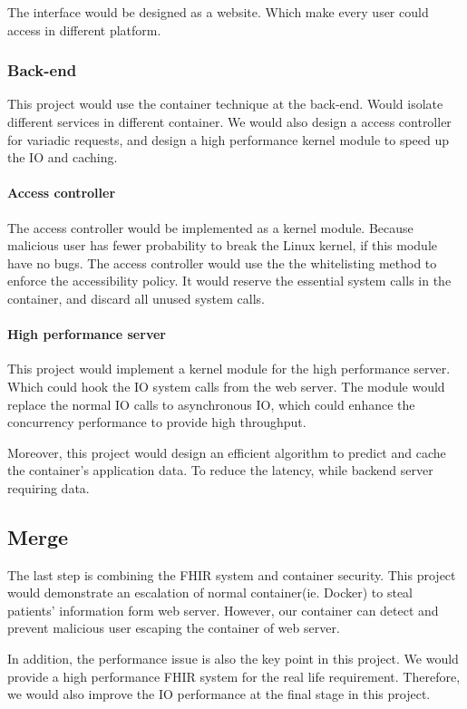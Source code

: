 \documentclass[12pt,a4paper]{IEEEconf}
\begin{document}
The interface would be designed as a website. Which make every user could access in different platform.

\subsubsection{Back-end}
This project would use the container technique at the back-end. Would isolate different services in
different container. We would also design a access controller for variadic requests, and
design a high performance kernel module to speed up the IO and caching.

\paragraph{Access controller}
The access controller would be implemented as a kernel module. Because malicious user has fewer
probability to break the Linux kernel, if this module have no bugs.
The access controller would use the the whitelisting method to enforce the accessibility policy.
It would reserve the essential system calls in the container, and discard all unused system calls.

\paragraph{High performance server}
This project would implement a kernel module for the high performance server. Which could hook the IO
system calls from the web server. The module would replace the normal IO calls to asynchronous IO,
which could enhance the concurrency performance to provide high throughput.

Moreover, this project would design an efficient algorithm to predict and cache the container's
application data. To reduce the latency, while backend server requiring data.

\subsection{Merge}
The last step is combining the FHIR system and container security. This project would demonstrate
an escalation of normal container(ie. Docker) to steal patients' information form web server.
However, our container can detect and prevent malicious user escaping the container of web server.

In addition, the performance issue is also the key point in this project. We would provide a
high performance FHIR system for the real life requirement. Therefore, we would also improve the
IO performance at the final stage in this project.
\end{document}
